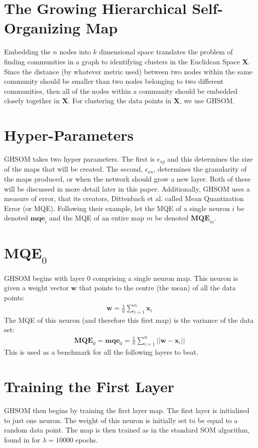 \documentclass{report}
\begin{document}
	\section{The Growing Hierarchical Self-Organizing Map}
	Embedding the $n$ nodes into $k$ dimensional space translates the problem of finding communities in a graph to identifying clusters in the Euclidean Space $\textbf{X}$. Since the distance (by whatever metric used) between two nodes within the same community should be smaller than two nodes belonging to two different communities, then all of the nodes within a community should be embedded closely together in $\textbf{X}$.
	For clustering the data points in $\textbf{X}$, we use GHSOM.
	
	\section{Hyper-Parameters}
	GHSOM takes two hyper parameters.
	The first is $\epsilon_{sg}$ and this determines the size of the maps that will be created. 
	The second, $\epsilon_{en}$, determines the granularity of the maps produced, or when the network should grow a new layer. 
	Both of these will be discussed in more detail later in this paper.
	Additionally, GHSOM uses a measure of error, that its creators, Dittenbach et al. \cite{dittenbach2000growing,dittenbach2002uncovering} called Mean Quantization Error (or MQE). 
	Following their example, let the MQE of a single neuron $i$ be denoted $\textbf{mqe}_i$ and the MQE of an entire map $m$ be denoted $\textbf{MQE}_m$.
	
	\section{$\textbf{MQE}_0$}
	GHSOM begins with layer 0 comprising a single neuron map. 
	This neuron is given a weight vector $\textbf{w}$ that points to the centre (the mean) of all the data points:
	\begin{align}
	\textbf{w} = \frac{1}{n} \sum_{i=1}^n \textbf{x}_i
	\end{align}
	The MQE of this neuron (and therefore this first map) is the variance of the data set:
	\begin{align}
	\textbf{MQE}_0 = \textbf{mqe}_0 = \frac{1}{n} \sum_{i=1}^n ||\textbf{w} - \textbf{x}_i||
	\end{align} 
	This is used as a benchmark for all the following layers to beat.
	
	\section{Training the First Layer}
	GHSOM then begins by training the first layer map. 
	The first layer is initialized to just one neuron. 
	The weight of this neuron is initially set to be equal to a random data point. 
	The map is then trained as in the standard SOM algorithm, found in \cite{kohonen1990self} for $\lambda=10000$ epochs.
	
\end{document}
